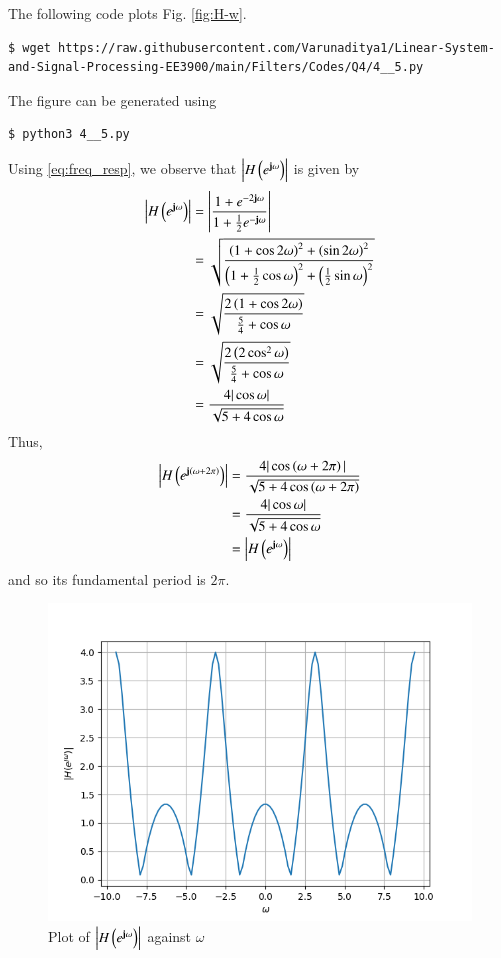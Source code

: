 \documentclass[journal,12pt,twocolumn]{IEEEtran}
\renewcommand\thesection{\arabic{section}}
\begin{document}
\begin{enumerate}[label=\thesection.\arabic*]
\solution The following code plots Fig. \eqref{fig:H-w}.
\begin{lstlisting}
$ wget https://raw.githubusercontent.com/Varunaditya1/Linear-System-and-Signal-Processing-EE3900/main/Filters/Codes/Q4/4__5.py
\end{lstlisting}
The figure can be generated using
\begin{lstlisting}
$ python3 4__5.py
\end{lstlisting}
Using \eqref{eq:freq_resp}, we observe that $\left|H\left(e^{\mathbf{j}\omega}\right)\right|$ is given by
\begin{align}
	\left|H\left(e^{\mathbf{j}\omega}\right)\right| &= \left|\frac{1 + e^{-2\mathbf{j}\omega}}{1 + \frac{1}{2}e^{-\mathbf{j}\omega}}\right| \\
									  &= \sqrt{\frac{\left(1 + \cos{2\omega}\right)^2 + \left(\sin{2\omega}\right)^2}{\left(1 + \frac{1}{2}\cos{\omega}\right)^2 + \left(\frac{1}{2}\sin{\omega}\right)^2}}\\
									  &= \sqrt{\frac{2\left(1 + \cos{2\omega}\right)}{\frac{5}{4} + \cos{\omega}}} \\
									  &= \sqrt{\frac{2\left(2\cos^2{\omega}\right)}{\frac{5}{4} + \cos{\omega}}} \\
									  &= \frac{4|\cos{\omega}|}{\sqrt{5 + 4\cos{\omega}}}
\end{align}
Thus,
\begin{align}
	\left|H\left(e^{\mathbf{j}\left(\omega + 2\pi\right)}\right)\right| &= \frac{4|\cos\left(\omega + 2\pi\right)|}{\sqrt{5 + 4\cos\left(\omega + 2\pi\right)}} \\
											   &= \frac{4|\cos{\omega}|}{\sqrt{5 + 4\cos{\omega}}} \\
											   &= \left|H\left(e^{\mathbf{j}\omega}\right)\right|	
\end{align}
and so its fundamental period is $2\pi$.
\begin{figure}[!ht]
	\centering
	\includegraphics[width=\columnwidth]{Figures/Q4/4__5.png}
	\caption{Plot of $\left|H\left(e^{\mathbf{j}\omega}\right)\right|$ against $\omega$}
	\label{fig:H-w}
\end{figure}


\end{enumerate}
\end{document}
